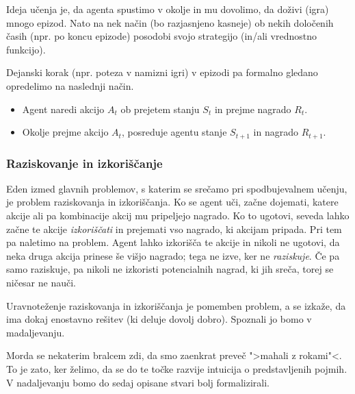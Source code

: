 \documentclass[12pt,a4paper]{amsart}
\theoremstyle{definition} %
\theoremstyle{plain} %
\begin{document}
Ideja učenja je, da agenta spustimo v okolje in mu dovolimo, da doživi (igra) mnogo epizod. Nato 
na nek način (bo razjasnjeno kasneje) ob nekih določenih časih (npr. po koncu epizode) posodobi 
svojo strategijo (in/ali vrednostno funkcijo). 

Dejanski korak (npr. poteza v namizni igri) v epizodi pa formalno gledano opredelimo na naslednji 
način.
\begin{itemize}
    \item Agent naredi akcijo $A_t$ ob prejetem stanju $S_t$ in prejme nagrado $R_t$.
    \item Okolje prejme akcijo $A_t$, posreduje agentu stanje $S_{t+1}$ in nagrado $R_{t+1}$.
\end{itemize}

\medspace


\subsubsection{Raziskovanje in izkoriščanje}
Eden izmed glavnih problemov, s katerim se srečamo pri spodbujevalnem učenju, je problem 
raziskovanja in izkoriščanja. Ko se agent uči, začne dojemati, katere akcije ali pa kombinacije 
akcij mu pripeljejo nagrado. Ko to ugotovi, seveda lahko začne te akcije \textit{izkoriščati} 
in prejemati vso nagrado, ki akcijam pripada. Pri tem pa naletimo na problem. Agent lahko izkorišča te 
akcije in nikoli ne ugotovi, da neka druga akcija prinese še višjo nagrado; tega ne izve, ker ne
\textit{raziskuje}. Če pa samo raziskuje, pa nikoli ne izkoristi potencialnih nagrad, ki jih sreča, 
torej se ničesar ne nauči. 

Uravnoteženje raziskovanja in izkoriščanja je pomemben problem, a se izkaže, da ima dokaj enostavno
rešitev (ki deluje dovolj dobro). Spoznali jo bomo v madaljevanju.

Morda se nekaterim bralcem zdi, da smo zaenkrat preveč ">mahali z rokami"<. To je zato, ker želimo, 
da se do te točke razvije intuicija o predstavljenih pojmih. V nadaljevanju bomo do sedaj opisane 
stvari bolj formalizirali.
\end{document}
